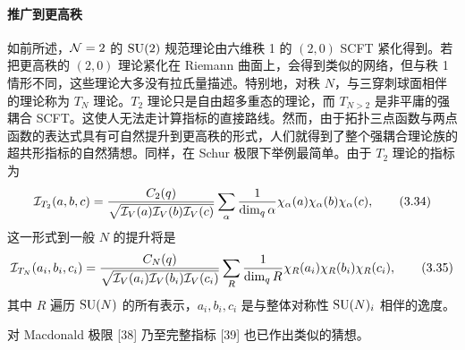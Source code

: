\paragraph{推广到更高秩} 如前所述，$\mathcal{N}=2$ 的 $\operatorname{SU}(2)$ 规范理论由六维秩 1 的 $(2,0)$ SCFT 紧化得到。若把更高秩的 $(2,0)$ 理论紧化在 Riemann 曲面上，会得到类似的网络，但与秩 1 情形不同，这些理论大多没有拉氏量描述。特别地，对秩 $N$，与三穿刺球面相伴的理论称为 $T_N$ 理论。$T_2$ 理论只是自由超多重态的理论，而 $T_{N>2}$ 是非平庸的强耦合 SCFT。这使人无法走计算指标的直接路线。然而，由于拓扑三点函数与两点函数的表达式具有可自然提升到更高秩的形式，人们就得到了整个强耦合理论族的超共形指标的自然猜想。同样，在 Schur 极限下举例最简单。由于 $T_2$ 理论的指标为
\[
\mathcal{I}_{T_2}(a,b,c)=\frac{C_2(q)}{\sqrt{\mathcal{I}_V(a)\mathcal{I}_V(b)\mathcal{I}_V(c)}}\sum_\alpha\frac{1}{\dim_q\alpha}\chi_\alpha(a)\chi_\alpha(b)\chi_\alpha(c) ,
\tag{3.34}
\]
这一形式到一般 $N$ 的提升将是
\[
\mathcal{I}_{T_N}(a_i,b_i,c_i)=\frac{C_N(q)}{\sqrt{\mathcal{I}_V(a_i)\mathcal{I}_V(b_i)\mathcal{I}_V(c_i)}}\sum_R\frac{1}{\dim_q R}\chi_R(a_i)\chi_R(b_i)\chi_R(c_i) ,
\tag{3.35}
\]
其中 $R$ 遍历 $\operatorname{SU}(N)$ 的所有表示，$a_i,b_i,c_i$ 是与整体对称性 $\operatorname{SU}(N)_i$ 相伴的逸度。

对 Macdonald 极限 [38] 乃至完整指标 [39] 也已作出类似的猜想。

